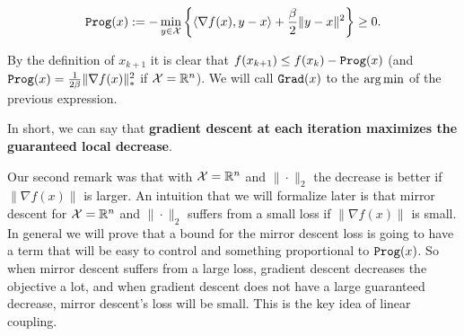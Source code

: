 \[
    {\tt{Prog}}(x) := - \min_{y\in\mathcal{X}} \left\{ \langle \nabla f(x), y-x \rangle + \frac{\beta}{2} \|{y-x}\|^2\right\} \geq 0.
\]

By the definition of $x_{k+1}$ it is clear that $f(x_{k+1}) \leq f(x_k) - {\tt{Prog}}(x)$ (and ${\tt{Prog}}(x) = \frac{1}{2\beta} \|\nabla f(x)\|_\ast^2$ if $\mathcal{X} = \mathbb{R}^n$). We will call ${\tt{Grad}}(x)$ to the $\operatorname*{arg\,min}$ of the previous expression.

In short, we can say that \textbf{gradient descent at each iteration maximizes the guaranteed local decrease}. 


Our second remark was that with $\mathcal{X} = \mathbb{R}^n$ and $\|\cdot \|_2$ the decrease is better if $\|\nabla f(x)\|$ is larger. An intuition that we will formalize later is that mirror descent for $\mathcal{X} = \mathbb{R}^n$ and $\|\cdot \|_2$ suffers from a small loss if $\|\nabla f(x)\|$ is small. In general we will prove that a bound for the mirror descent loss is going to have a term that will be easy to control and something proportional to ${\tt{Prog}}(x)$. So when mirror descent suffers from a large loss, gradient descent decreases the objective a lot, and when gradient descent does not have a large guaranteed decrease, mirror descent's loss will be small. This is the key idea of linear coupling.

